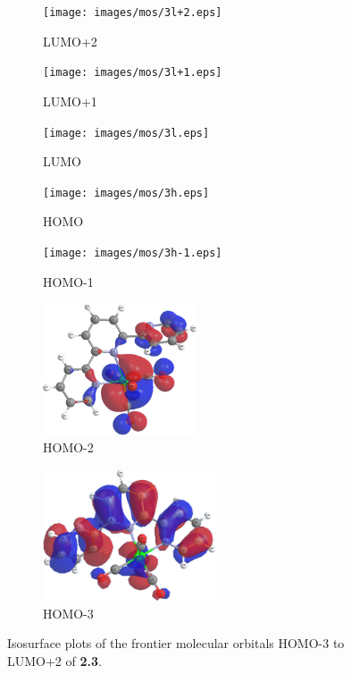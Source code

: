 \begin{figure}[!ht]
 \centering
 \begin{subfigure}[b]{0.31\textwidth}
  \texttt{[image: images/mos/3l+2.eps]}
  \caption{LUMO+2}
 \end{subfigure}
  \begin{subfigure}[b]{0.31\textwidth}
  \texttt{[image: images/mos/3l+1.eps]}
  \caption{LUMO+1}
 \end{subfigure}
  \begin{subfigure}[b]{0.31\textwidth}
  \texttt{[image: images/mos/3l.eps]}
  \caption{LUMO}
 \end{subfigure}
 \begin{subfigure}[b]{0.31\textwidth}
  \texttt{[image: images/mos/3h.eps]}
  \caption{HOMO}
 \end{subfigure}
 \begin{subfigure}[b]{0.31\textwidth}
  \texttt{[image: images/mos/3h-1.eps]}
  \caption{HOMO-1}
 \end{subfigure}
 \begin{subfigure}[b]{0.31\textwidth}
  \includegraphics[clip=true, width=\textwidth, height=39mm, keepaspectratio]{images/mos/3h-2.eps}
  \caption{HOMO-2}
 \end{subfigure}
 \begin{subfigure}[b]{0.31\textwidth}
  \includegraphics[clip=true, width=\textwidth, height=39mm, keepaspectratio]{images/mos/3h-3.eps}
  \caption{HOMO-3}
 \end{subfigure}
\caption[Molecular orbitals HOMO-3 to LUMO+2 of \textbf{2.3}.]{Isosurface plots of the frontier molecular orbitals HOMO-3 to LUMO+2 of \textbf{2.3}.}
\label{fig.mo23}
\end{figure} 

